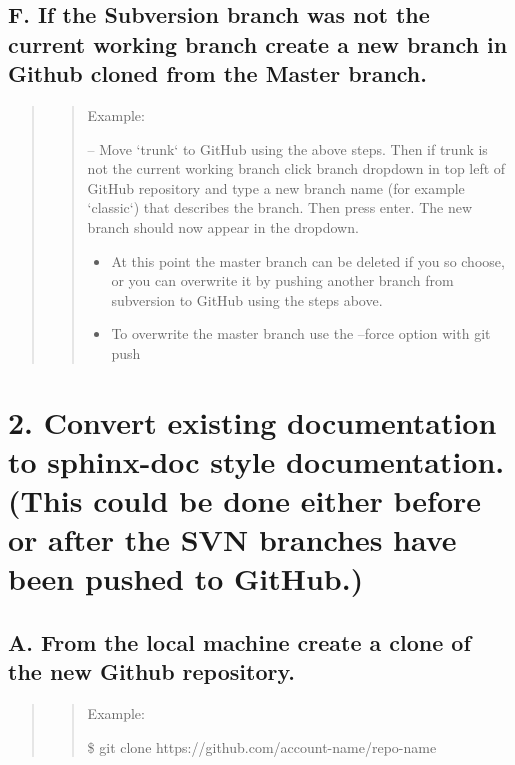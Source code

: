 \documentclass[letterpaper,10pt,english]{sphinxmanual}
\begin{document}
\subsection{F. If the Subversion branch was not the current working branch create a new branch in Github cloned from the Master branch.}
\label{docs/Process:f-if-the-subversion-branch-was-not-the-current-working-branch-create-a-new-branch-in-github-cloned-from-the-master-branch}\begin{quote}
\begin{quote}

Example:

-- Move `trunk` to GitHub using the above steps. Then if trunk is not the current working branch click branch dropdown in top left of GitHub repository and type a new branch name (for example `classic`) that describes the branch. Then press enter. The new branch should now appear in the dropdown.
\begin{itemize}
\item {} 
At this point the master branch can be deleted if you so choose, or you can overwrite it by pushing another branch from subversion to GitHub using the steps above.

\item {} 
To overwrite the master branch use the --force option with git push

\end{itemize}
\end{quote}
\end{quote}


\section{2. Convert existing documentation to sphinx-doc style documentation. (This could be done either before or after the SVN branches have been pushed to GitHub.)}
\label{docs/Process:convert-existing-documentation-to-sphinx-doc-style-documentation-this-could-be-done-either-before-or-after-the-svn-branches-have-been-pushed-to-github}

\subsection{A. From the local machine create a clone of the new Github repository.}
\label{docs/Process:a-from-the-local-machine-create-a-clone-of-the-new-github-repository}\begin{quote}
\begin{quote}

Example:

\$ git clone https://github.com/account-name/repo-name
\end{quote}
\end{quote}
\end{document}
